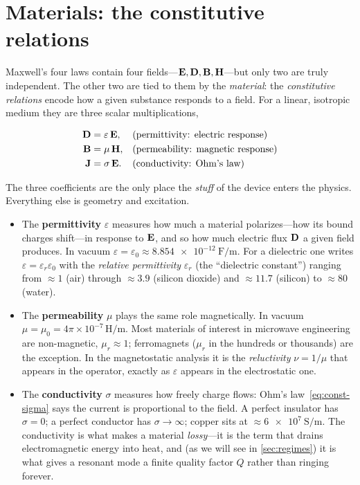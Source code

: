 \section{Materials: the constitutive relations}
\label{sec:constitutive}

Maxwell's four laws contain four fields---$\mathbf{E},\mathbf{D},\mathbf{B},\mathbf{H}$---but only two are
truly independent. The other two are tied to them by the \emph{material}: the
\emph{constitutive relations} encode how a given substance responds to a field.
For a linear, isotropic medium they are three scalar multiplications,

\begin{align}
  \mathbf{D} &= \varepsilon\,\mathbf{E}, & &\text{(permittivity: electric response)} \label{eq:const-eps}\\
  \mathbf{B} &= \mu\,\mathbf{H}, & &\text{(permeability: magnetic response)} \label{eq:const-mu}\\
  \mathbf{J} &= \sigma\,\mathbf{E}. & &\text{(conductivity: Ohm's law)} \label{eq:const-sigma}
\end{align}

The three coefficients are the only place the \emph{stuff} of the device enters
the physics. Everything else is geometry and excitation.

\begin{itemize}
  \item The \textbf{permittivity} $\varepsilon$ measures how much a material
  polarizes---how its bound charges shift---in response to $\mathbf{E}$, and so how
  much electric flux $\mathbf{D}$ a given field produces. In vacuum
  $\varepsilon=\varepsilon_0\approx\SI{8.854e-12}{\farad\per\meter}$. For a
  dielectric one writes $\varepsilon=\varepsilon_r\varepsilon_0$ with the
  \emph{relative permittivity} $\varepsilon_r$ (the ``dielectric constant'')
  ranging from $\approx 1$ (air) through $\approx 3.9$ (silicon dioxide) and
  $\approx 11.7$ (silicon) to $\approx 80$ (water).

  \item The \textbf{permeability} $\mu$ plays the same role magnetically. In
  vacuum $\mu=\mu_0=4\pi\times10^{-7}\,\si{\henry\per\meter}$. Most materials of
  interest in microwave engineering are non-magnetic, $\mu_r\approx 1$;
  ferromagnets ($\mu_r$ in the hundreds or thousands) are the exception. In the
  magnetostatic analysis it is the \emph{reluctivity} $\nu=1/\mu$ that appears
  in the operator, exactly as $\varepsilon$ appears in the electrostatic one.

  \item The \textbf{conductivity} $\sigma$ measures how freely charge flows:
  Ohm's law~\eqref{eq:const-sigma} says the current is proportional to the
  field. A perfect insulator has $\sigma=0$; a perfect conductor has
  $\sigma\to\infty$; copper sits at $\approx\SI{6e7}{\siemens\per\meter}$. The
  conductivity is what makes a material \emph{lossy}---it is the term that
  drains electromagnetic energy into heat, and (as we will see in
  \cref{sec:regimes}) it is what gives a resonant mode a finite quality factor
  $Q$ rather than ringing forever.
\end{itemize}

